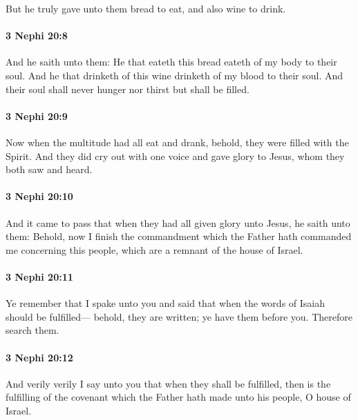 			But he truly gave unto them bread to eat, and also wine to drink.

		\paragraph{3 Nephi 20:8} %
			\label{3NEPHI-20-8}

			And he saith unto them:
			He that eateth this bread eateth of my body to their soul.
			And he that drinketh of this wine drinketh of my blood to their soul.
			And their soul shall never hunger nor thirst but shall be filled.

		\paragraph{3 Nephi 20:9} %
			\label{3NEPHI-20-9}

			Now when the multitude had all eat and drank,
			behold, they were filled with the Spirit.
			And they did cry out with one voice
			and gave glory to Jesus, whom they both saw and heard.

		\paragraph{3 Nephi 20:10} %
			\label{3NEPHI-20-10}

			And it came to pass that when they had all given glory unto Jesus,
			he saith unto them:
			Behold, now I finish the commandment
			which the Father hath commanded me concerning this people,
			which are a remnant of the house of Israel.

		\paragraph{3 Nephi 20:11} %
			\label{3NEPHI-20-11}

			Ye remember that I spake unto you
			and said that when the words of Isaiah should be fulfilled---
			behold, they are written;
			ye have them before you.
			Therefore search them.

		\paragraph{3 Nephi 20:12} %
			\label{3NEPHI-20-12}

			And verily verily I say unto you
			that when they shall be fulfilled,
			then is the fulfilling of the covenant
			which the Father hath made unto his people, O house of Israel.

